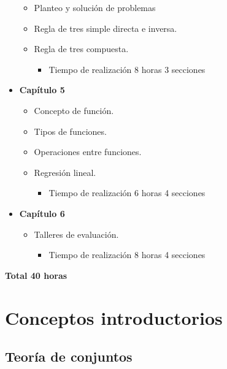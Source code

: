 \documentclass[
]{book}
\providecommand{\tightlist}{%
  \setlength{\itemsep}{0pt}\setlength{\parskip}{0pt}}
\begin{document}
\begin{itemize}
  \begin{itemize}
  \tightlist
  \item
    Planteo y solución de problemas
  \item
    Regla de tres simple directa e inversa.
  \item
    Regla de tres compuesta.

    \begin{itemize}
    \tightlist
    \item
      Tiempo de realización 8 horas 3 secciones
    \end{itemize}
  \end{itemize}
\item
  \textbf{Capítulo 5}

  \begin{itemize}
  \tightlist
  \item
    Concepto de función.
  \item
    Tipos de funciones.
  \item
    Operaciones entre funciones.
  \item
    Regresión lineal.

    \begin{itemize}
    \tightlist
    \item
      Tiempo de realización 6 horas 4 secciones
    \end{itemize}
  \end{itemize}
\item
  \textbf{Capítulo 6}

  \begin{itemize}
  \tightlist
  \item
    Talleres de evaluación.

    \begin{itemize}
    \tightlist
    \item
      Tiempo de realización 8 horas 4 secciones
    \end{itemize}
  \end{itemize}
\end{itemize}

\textbf{Total 40 horas}

\hypertarget{conceptos-introductorios}{%
\chapter{Conceptos introductorios}\label{conceptos-introductorios}}

\hypertarget{teoruxeda-de-conjuntos}{%
\section{Teoría de conjuntos}\label{teoruxeda-de-conjuntos}}
\end{document}
